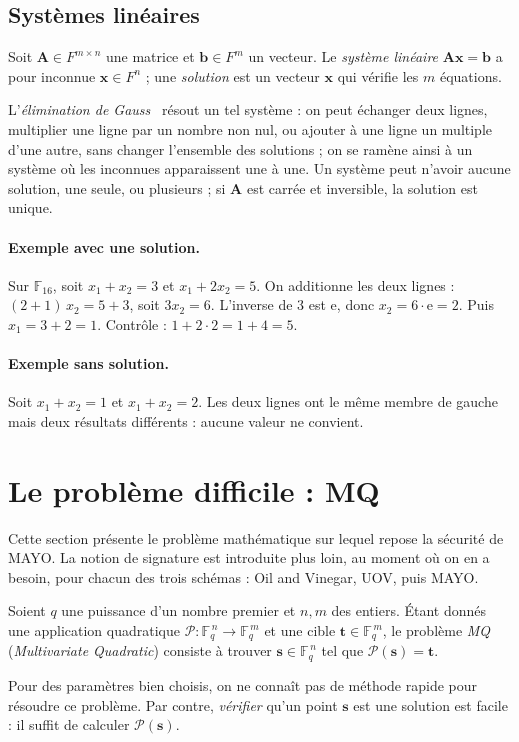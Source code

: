 \subsection{Systèmes linéaires}\label{sec:math-lin}
\begin{definition}
Soit $\mathbf{A}\in F^{m\times n}$ une matrice et $\mathbf{b}\in F^m$ un vecteur. Le \emph{système linéaire} $\mathbf{A}\mathbf{x}=\mathbf{b}$ a pour inconnue $\mathbf{x}\in F^n$ ; une \emph{solution} est un vecteur $\mathbf{x}$ qui vérifie les $m$ équations.
\end{definition}
L'\emph{élimination de Gauss}~\cite{horn} résout un tel système : on peut échanger deux lignes, multiplier une ligne par un nombre non nul, ou ajouter à une ligne un multiple d'une autre, sans changer l'ensemble des solutions ; on se ramène ainsi à un système où les inconnues apparaissent une à une. Un système peut n'avoir aucune solution, une seule, ou plusieurs ; si $\mathbf{A}$ est carrée et inversible, la solution est unique.

\paragraph{Exemple avec une solution.} Sur $\mathbb{F}_{16}$, soit $x_1+x_2=3$ et $x_1+2x_2=5$. On additionne les deux lignes : $(2+1)\,x_2=5+3$, soit $3x_2=6$. L'inverse de $3$ est $\mathrm{e}$, donc $x_2=6\cdot\mathrm{e}=2$. Puis $x_1=3+2=1$. Contrôle : $1+2\cdot2=1+4=5$.

\paragraph{Exemple sans solution.} Soit $x_1+x_2=1$ et $x_1+x_2=2$. Les deux lignes ont le même membre de gauche mais deux résultats différents : aucune valeur ne convient.

\section{Le problème difficile : MQ}\label{sec:signature}
Cette section présente le problème mathématique sur lequel repose la sécurité de MAYO. La notion de signature est introduite plus loin, au moment où on en a besoin, pour chacun des trois schémas : Oil and Vinegar, UOV, puis MAYO.

\begin{definition}
Soient $q$ une puissance d'un nombre premier et $n,m$ des entiers. Étant donnés une application quadratique $\mathcal{P}:\mathbb{F}_q^{\,n}\to\mathbb{F}_q^{\,m}$ et une cible $\mathbf{t}\in\mathbb{F}_q^{\,m}$, le problème \emph{MQ} (\emph{Multivariate Quadratic}) consiste à trouver $\mathbf{s}\in\mathbb{F}_q^{\,n}$ tel que $\mathcal{P}(\mathbf{s})=\mathbf{t}$.
\end{definition}
Pour des paramètres bien choisis, on ne connaît pas de méthode rapide pour résoudre ce problème. Par contre, \emph{vérifier} qu'un point $\mathbf{s}$ est une solution est facile : il suffit de calculer $\mathcal{P}(\mathbf{s})$.

